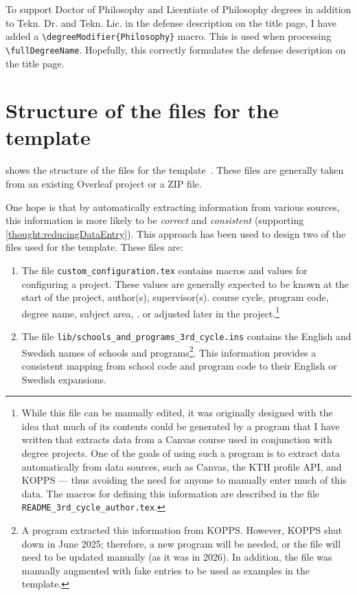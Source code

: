 \documentclass[12pt, twoside]{article}
\newcommand{\fname}[1]{\texttt{#1}}
\begin{document}
To support Doctor of Philosophy and Licentiate of Philosophy degrees in addition to Tekn. Dr. and Tekn. Lic. in the defense description on the title page, I have added a \texttt{\textbackslash degreeModifier\{Philosophy\}} macro. This is used when processing \texttt{\textbackslash fullDegreeName}. Hopefully, this correctly formulates the defense description on the title page.

\section{Structure of the files for the template}
 shows the structure of the files for the template~\cite{maguire2026kthtemplate}. These files are generally taken from an existing Overleaf project\cite{maguire2026kthtemplateGithub} or a ZIP file.

One hope is that by automatically extracting information from various sources, this information is more likely to be \textit{correct} and \textit{consistent} (supporting \ref{thought:reducingDataEntry}). This approach has been used to design two of the files used for the template. These files are:
\begin{enumerate}
    \item The file \fname{custom\_configuration.tex} contains macros and values for configuring a project. These values are generally expected to be known at the start of the project, \eg author(s), supervisor(s). course cycle, program code, degree name, subject area, \etc. or adjusted later in the project.\footnote{While this file can be manually edited, it was originally designed with the idea that much of its contents could be generated by a program that I have written that extracts data from a Canvas course used in conjunction with degree projects. One of the goals of using such a program is to extract data automatically from data sources, such as Canvas, the \gls{KTH} profile \gls{API}, and \gls{KOPPS}
    --- thus avoiding the need for anyone to manually enter much of this data. The macros for defining this information are described in the file \fname{README\_3rd\_cycle\_author.tex}.}

    \item The file \fname{lib/schools\_and\_programs\_3rd\_cycle.ins} contains the English and Swedish names of schools and programs\footnote{A program extracted this information from KOPPS. However, KOPPS shut down in June 2025; therefore, a new program will be needed, or the file will need to be updated manually (as it was in 2026). In addition, the file was manually augmented with fake entries to be used as examples in the template.}. This information provides a consistent mapping from school code and program code to their English or Swedish expansions.
\end{enumerate}
\end{document}
